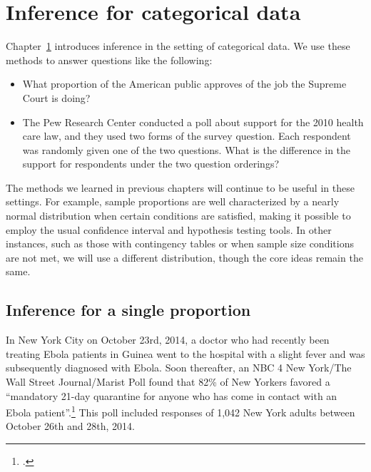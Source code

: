 \chapter{Inference for categorical data}
\label{inferenceForCategoricalData}
\label{ch_inference_for_props}

Chapter~\ref{inferenceForCategoricalData} introduces inference in the setting of categorical data. We use these methods to answer questions like the following:
\begin{itemize}
\setlength{\itemsep}{0mm}
\item What proportion of the American public approves of the job the Supreme Court is doing?
\item The Pew Research Center conducted a poll about support for the 2010 health care law, and they used two forms of the survey question. Each respondent was randomly given one of the two questions. What is the difference in the support for respondents under the two question orderings?
\end{itemize}
The methods we learned in previous chapters will continue to be useful in these settings. For example, sample proportions are well characterized by a nearly normal distribution when certain conditions are satisfied, making it possible to employ the usual confidence interval and hypothesis testing tools. In other instances, such as those with contingency tables or when sample size conditions are not met, we will use a different distribution, though the core ideas remain the same.


\section[Inference for a single proportion]{Inference for a single proportion ~}
\label{singleProportion}


In New York City on October 23rd, 2014, a doctor who had recently been treating Ebola patients in Guinea went to the hospital with a slight fever and was subsequently diagnosed with Ebola. Soon thereafter, an NBC 4 New York/The Wall Street Journal/Marist Poll found that 82\% of New Yorkers favored a ``mandatory 21-day quarantine for anyone who has come in contact with an Ebola patient''.\footnote{.} This poll included responses of 1,042 New York adults between October 26th and 28th, 2014.



